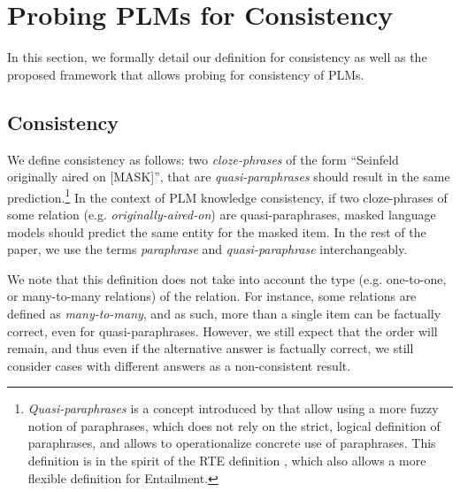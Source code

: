 \section{Probing PLMs for Consistency}
\label{sec:probe}

In this section, we formally detail our definition for consistency as well as the proposed framework that allows probing for consistency of PLMs.

\subsection{Consistency}
We define consistency as follows: two \textit{cloze-phrases} of the form ``Seinfeld originally aired on [MASK]'', that are \textit{quasi-paraphrases} should result in the same prediction.\footnote{\textit{Quasi-paraphrases} is a concept introduced by \citet{what_is_paraphrase} that allow using a more fuzzy notion of paraphrases, which does not rely on the strict, logical definition of paraphrases, and allows to operationalize concrete use of paraphrases. This definition is in the spirit of the RTE definition \cite{dagan-rte}, which also allows a more flexible definition for Entailment.}
In the context of PLM knowledge consistency, if two cloze-phrases 
of some relation (e.g. \textit{originally-aired-on}) are quasi-paraphrases, masked language models should predict the same entity for the masked item. 
In the rest of the paper, we use the terms \textit{paraphrase} and \textit{quasi-paraphrase} interchangeably.

 

We note that this definition does not take into account the type (e.g. one-to-one, or many-to-many relations) of the relation. %
For instance, some relations are defined as \textit{many-to-many}, and as such, more than a single item can be factually correct, even for quasi-paraphrases. However, we still expect that the order will remain, and thus even if the alternative answer is factually correct, we still consider cases with different answers as a non-consistent result.

